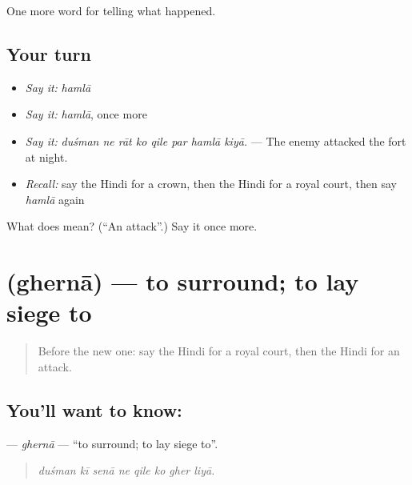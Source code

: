 \begin{grammarlens}[title={What you've built}]
One more word for telling what happened.
\end{grammarlens}

\subsection*{Your turn}
\begin{itemize}
\raggedright
  \item \emph{Say it:} \emph{hamlā}
  \item \emph{Say it:} \emph{hamlā}, once more
  \item \emph{Say it:} \emph{duśman ne rāt ko qile par hamlā kiyā.} — The enemy attacked the fort at night.
  \item \emph{Recall:} say the Hindi for a crown, then the Hindi for a royal court, then say \emph{hamlā} again
\end{itemize}

\begin{tcolorbox}[breakable,colback=teal!4,colframe=teal!35!black,title={Before you move on}]
What does  mean? (\textquotedblleft{}An attack\textquotedblright{}.) Say it once more.
\end{tcolorbox}
\section[\texorpdfstring{\hi{घेरना} (ghernā)}{घेरना (ghernā)}]{ (ghernā) — to surround; to lay siege to}

\label{lesson:HI-C321-gherna}



\begin{quote}
Before the new one: say the Hindi for a royal court, then the Hindi for an attack.
\end{quote}

\subsection*{You'll want to know: }
\textbf{} — \emph{ghernā} — \textquotedblleft{}to surround; to lay siege to\textquotedblright{}.

\begin{quote}
       
\end{quote}

\begin{quote}
\emph{duśman kī senā ne qile ko gher liyā.}
\end{quote}

